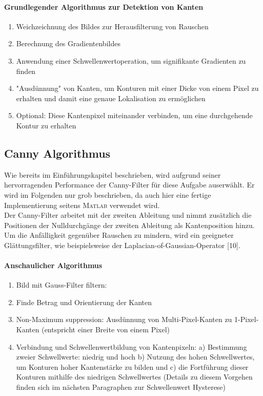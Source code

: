 \documentclass[accentcolor=tud1c, 11pt, toc=bib, toc=listof, captions=abovetable, parskip=half]{tudreport}
\begin{document}
\paragraph{Grundlegender Algorithmus zur Detektion von Kanten}
\begin{enumerate}
\item Weichzeichnung des Bildes zur Herausfilterung von Rauschen
\item Berechnung des Gradientenbildes
\item Anwendung einer Schwellenwertoperation, um signifikante Gradienten zu finden
\item "Ausdünnung" von Kanten, um Konturen mit einer Dicke von einem Pixel zu erhalten und damit eine genaue Lokalisation zu ermöglichen
\item Optional: Diese Kantenpixel miteinander verbinden, um eine durchgehende Kontur zu erhalten
\end{enumerate}

\subsection{Canny Algorithmus}
Wie bereits im Einführungskapitel beschrieben, wird aufgrund seiner hervorragenden Performance der Canny-Filter für diese Aufgabe auserwählt. Er wird im Folgenden nur grob beschrieben, da auch hier eine fertige Implementierung seitens \textsc{Matlab} verwendet wird.\\
Der Canny-Filter arbeitet mit der zweiten Ableitung und nimmt zusätzlich die Positionen der Nulldurchgänge der zweiten Ableitung als Kantenposition hinzu. Um die Anfälligkeit gegenüber Rauschen zu mindern, wird ein geeigneter Glättungsfilter, wie beispielsweise der Laplacian-of-Gaussian-Operator [10].\\

\paragraph{Anschaulicher Algorithmus}
\begin{enumerate}
\item Bild mit Gauss-Filter filtern: 
\item Finde Betrag und Orientierung der Kanten
\item Non-Maximum suppression: Ausdünnung von Multi-Pixel-Kanten zu 1-Pixel-Kanten (entspricht einer Breite von einem Pixel)
\item Verbindung und Schwellenwertbildung von Kantenpixeln: a) Bestimmung zweier Schwellwerte: niedrig und hoch b) Nutzung des hohen Schwellwertes, um Konturen hoher Kantenstärke zu bilden und c) die Fortführung dieser Konturen mithilfe des niedrigen Schwellwertes (Details zu diesem Vorgehen finden sich im nächsten Paragraphen zur Schwellenwert Hysterese)
\end{enumerate}
\end{document}
